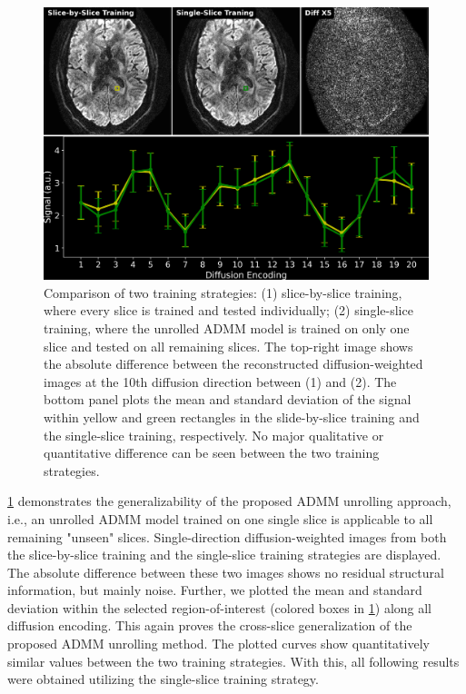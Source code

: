 \documentclass[AMA,STIX2COL,Linenumberson]{MRM}
\begin{document}
\begin{figure}
    \includegraphics[width=\textwidth]{./figures/fig3.png}
    \caption{Comparison of two training strategies:
            (1) slice-by-slice training,
            where every slice is trained and tested individually;
            (2) single-slice training,
            where the unrolled ADMM model is trained on only one slice
            and tested on all remaining slices.
            The top-right image shows the absolute difference
            between the reconstructed diffusion-weighted images
            at the 10th diffusion direction
            between (1) and (2).
            The bottom panel plots the mean and standard deviation
            of the signal within yellow and green rectangles
            in the slide-by-slice training and the single-slice training,
            respectively.
            No major qualitative or quantitative difference can be seen
            between the two training strategies.}
    \label{FIG:GENERALIZATION}
\end{figure}

\cref{FIG:GENERALIZATION} demonstrates the generalizability
of the proposed ADMM unrolling approach,
i.e., an unrolled ADMM model trained on one single slice
is applicable to all remaining "unseen" slices.
Single-direction diffusion-weighted images from
both the slice-by-slice training
and the single-slice training strategies are displayed.
The absolute difference between these two images
shows no residual structural information, but mainly noise.
Further, we plotted the mean and standard deviation
within the selected region-of-interest (colored boxes in \cref{FIG:GENERALIZATION})
along all diffusion encoding.
This again proves the cross-slice generalization
of the proposed ADMM unrolling method.
The plotted curves show quantitatively similar values
between the two training strategies.
With this, all following results were obtained
utilizing the single-slice training strategy.
\end{document}
